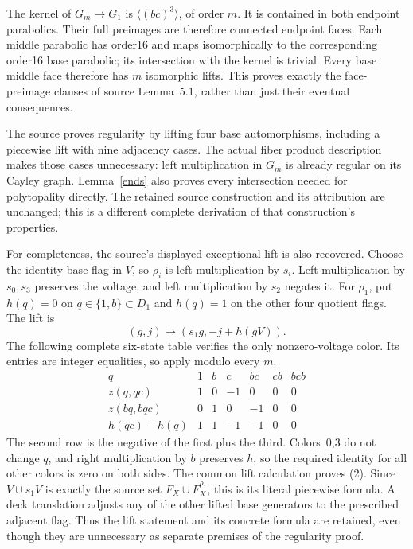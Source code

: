 \documentclass[a4paper,11pt]{article}
\newcommand{\gen}[1]{\langle#1\rangle}\newcommand{\Aut}{\operatorname{Aut}}
\begin{document}
The kernel of $G_m\to G_1$ is $\gen{(bc)^3}$, of order $m$.
It is contained in both endpoint parabolics. Their full preimages are
therefore connected endpoint faces. Each middle parabolic has order16
and maps isomorphically to the corresponding order16 base parabolic;
its intersection with the kernel is trivial. Every base middle face
therefore has $m$ isomorphic lifts. This proves exactly the face-preimage
clauses of source Lemma~5.1, rather than just their eventual consequences.

The source proves regularity by lifting four base automorphisms,
including a piecewise lift with nine adjacency cases. The actual fiber
product description makes those cases unnecessary: left multiplication
in $G_m$ is already regular on its Cayley graph. Lemma~\ref{ends}
also proves every intersection needed for polytopality directly. The
retained source construction and its attribution are unchanged; this
is a different complete derivation of that construction's properties.

For completeness, the source's displayed exceptional lift is also recovered.
Choose the identity base flag in $V$, so $\rho_i$ is left multiplication
by $s_i$. Left multiplication by $s_0,s_3$ preserves the voltage, and left
multiplication by $s_2$ negates it. For $\rho_1$, put $h(q)=0$ on
$q\in\{1,b\}\subset D_1$ and $h(q)=1$ on the other four quotient flags.
The lift is
\[
(g,j)\longmapsto(s_1g,-j+h(gV)).                 \tag{2}
\]
The following complete six-state table verifies the only nonzero-voltage
color. Its entries are integer equalities, so apply modulo every $m$.
\[
\begin{array}{c|rrrrrr}
q&1&b&c&bc&cb&bcb\\\hline
z(q,qc)&1&0&-1&0&0&0\\
z(bq,bqc)&0&1&0&-1&0&0\\
h(qc)-h(q)&1&1&-1&-1&0&0
\end{array}
\]
The second row is the negative of the first plus the third. Colors~0,3
do not change $q$, and right multiplication by $b$ preserves $h$, so
the required identity for all other colors is zero on both sides.
The common lift calculation proves (2). Since
$V\cup s_1V$ is exactly the source set $F_X\cup F_X^{\rho_1}$,
this is its literal piecewise formula. A deck translation adjusts any
of the other lifted base generators to the prescribed adjacent flag.
Thus the lift statement and its concrete formula are retained, even
though they are unnecessary as separate premises of the regularity proof.
\end{document}
